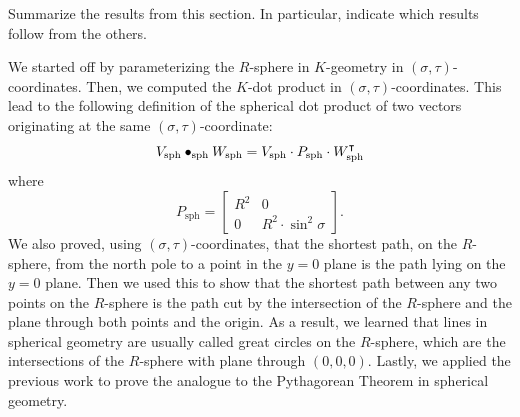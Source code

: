 \documentclass[newpage,hints,handout]{ximera}
\begin{document}
\begin{problem}
Summarize the results from this section. In particular, indicate which
results follow from the others.
\begin{freeResponse}
We started off by parameterizing the $R$-sphere in $K$-geometry in $\left(\sigma,\tau \right)$-coordinates. Then, we computed the $K$-dot product in  $\left(\sigma,\tau \right)$-coordinates. This lead to the following definition of the spherical dot product of two vectors originating at the same $\left(\sigma,\tau \right)$-coordinate: 
\[
  V_\mathrm{sph} \bullet_\mathrm{sph} W_\mathrm{sph} = V_\mathrm{sph} \cdot P_\mathrm{sph} \cdot W_\mathrm{sph}^\intercal
  \]
  where
  \[
  P_\mathrm{sph} =
  \begin{bmatrix}
    R^2 & 0 \\
    0 & R^2\cdot\sin^2 \sigma
  \end{bmatrix}.
  \]
We also proved, using $\left(\sigma,\tau \right)$-coordinates, that the shortest path, on the $R$-sphere, from the north pole to a point in the $y=0$ plane is the path lying on the $y=0$ plane. Then we used this to show that the shortest path between any two points on the $R$-sphere is the path cut by the intersection of the $R$-sphere and the plane through both points and the origin. As a result, we learned that lines in spherical geometry are usually called great circles on the $R$-sphere, which are the intersections of the $R$-sphere with plane through $\left(0, 0, 0\right)$. Lastly, we applied the previous work to prove the analogue to the Pythagorean Theorem in spherical geometry. 
\end{freeResponse}
\end{problem}
\end{document}
